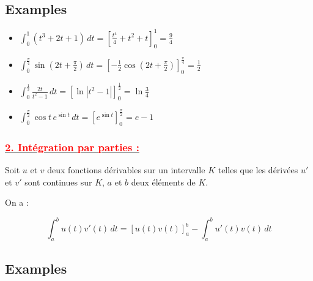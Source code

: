 \documentclass[12pt]{article}
\begin{document}
\subsection*{Examples}

\begin{itemize}
    \item \( \int_0^1 \left( t^3 + 2t + 1 \right) \, dt = \left[ \frac{t^4}{4} + t^2 + t \right]_0^1 = \frac{9}{4} \)
    
    \item \( \int_0^{\frac{\pi}{4}} \sin \left( 2t + \frac{\pi}{2} \right) \, dt = \left[ -\frac{1}{2} \cos \left( 2t + \frac{\pi}{2} \right) \right]_0^{\frac{\pi}{4}} = \frac{1}{2} \)
    
    \item \( \int_0^{\frac{1}{2}} \frac{2t}{t^2 - 1} \, dt = \left[ \ln |t^2 - 1| \right]_0^{\frac{1}{2}} = \ln \frac{3}{4} \)
    
    \item \( \int_0^{\frac{\pi}{2}} \cos t \, e^{\sin t} \, dt = \left[ e^{\sin t} \right]_0^{\frac{\pi}{2}} = e - 1 \)
\end{itemize}

\subsubsection*{\underline{\textcolor{red}{2. Intégration par parties :}}}
Soit \( u \) et \( v \) deux fonctions dérivables sur un intervalle \( K \) telles que les dérivées \( u' \) et \( v' \) sont continues sur \( K \), \( a \) et \( b \) deux éléments de \( K \).

On a :

\[
\int_a^b u(t) v'(t) \, dt = \left[ u(t) v(t) \right]_a^b - \int_a^b u'(t) v(t) \, dt
\]

\subsection*{Examples}
\end{document}
